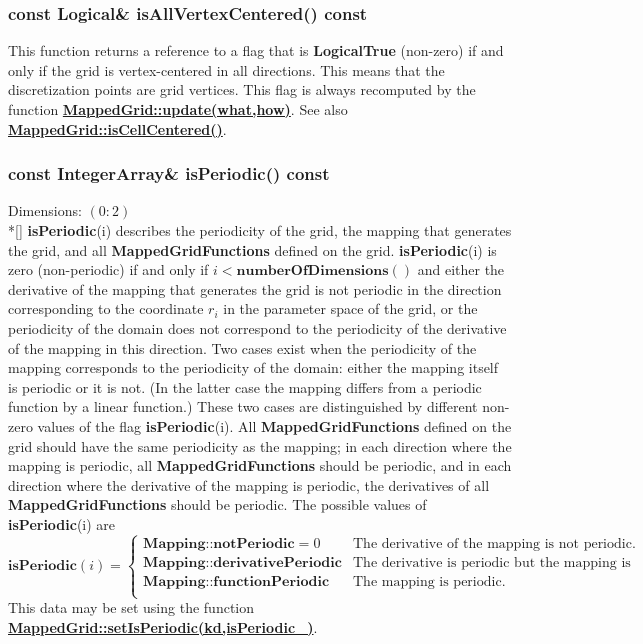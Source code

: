 \documentclass{article}
\begin{document}
  \subsubsection{const Logical\& isAllVertexCentered() const}
  \label{MappedGrid::isAllVertexCentered() const}
    This function returns a reference to a flag that is \textbf{LogicalTrue} (non-zero) if and only if
    the grid is vertex-centered in all directions.
    This means that the discretization points are grid vertices.
    This flag is always recomputed by the function
    {\bf{}\hyperref{update(what,how)}{update(what,how) \rm(\S}{)}{MappedGrid::update(what,how)}}.
    See also {\bf{}\hyperref{isCellCentered()}{isCellCentered() \rm(\S}{)}{MappedGrid::isCellCentered()}}.

  \subsubsection{const IntegerArray\& isPeriodic() const}
  \label{MappedGrid::isPeriodic()}
    Dimensions: $(0\colon2)$ \\*[\parskip]
    \textbf{isPeriodic}(i) describes the periodicity of the grid,
    the mapping that generates the grid, and all \textbf{MappedGridFunctions}
    defined on the grid.  \textbf{isPeriodic}(i) is zero (non-periodic) if and
    only if $i<\textbf{numberOfDimensions}()$ and either the derivative of the
    mapping that generates the grid is not periodic in the direction corresponding
    to the coordinate $r_i$ in the parameter space of the grid, or the periodicity
    of the domain does not correspond to the periodicity of the derivative of the
    mapping in this direction.  Two cases exist when the periodicity of the mapping
    corresponds to the periodicity of the domain:  either the mapping itself is
    periodic or it is not.  (In the latter case the mapping differs from a periodic
    function by a linear function.)  These two cases are distinguished by different
    non-zero values of the flag \textbf{isPeriodic}(i).
    All \textbf{MappedGridFunctions} defined on the grid should have the same
    periodicity as the mapping; in each direction where the mapping is periodic,
    all \textbf{MappedGridFunctions} should be periodic, and in each direction
    where the derivative of the mapping is periodic, the derivatives of all
    \textbf{MappedGridFunctions} should be periodic.  The possible values of
    \textbf{isPeriodic}(i) are
    \[ \textbf{isPeriodic}(i) = \left\{ \begin{array}{ll}
      \textbf{Mapping::notPeriodic} = 0    & \mbox{The derivative of the mapping is not periodic.}     \\
      \textbf{Mapping::derivativePeriodic} & \mbox{The derivative is periodic but the mapping is not.} \\
      \textbf{Mapping::functionPeriodic}   & \mbox{The mapping is periodic.}                           \\
    \end{array} \right. \]
    This data may be set using the function
    {\bf{}\hyperref{setIsPeriodic(kd,isPeriodic\_)}{setIsPeriodic(kd,isPeriodic\_) \rm(\S}{)}{MappedGrid::setIsPeriodic(kd,isPeriodic_)}}.
\end{document}
